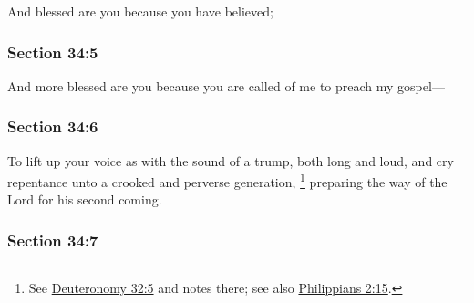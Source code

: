 		And blessed are you because you have believed;


	\subsubsection{Section 34:5} %
		\label{DC34-5}

		And more blessed are you because you are called of me to preach my gospel---


	\subsubsection{Section 34:6} %
		\label{DC34-6}

		To lift up your voice as with the sound of a trump, both long and loud, and cry repentance unto a crooked and perverse generation,%
			\footnote{%
				See \hyperref[DEUTERONOMY-32-5]{Deuteronomy 32:5} and notes there; see also \hyperref[PHILIPPIANS-2-15]{Philippians 2:15}.
				} 
		preparing the way of the Lord for his second coming.


	\subsubsection{Section 34:7} %
		\label{DC34-7}

